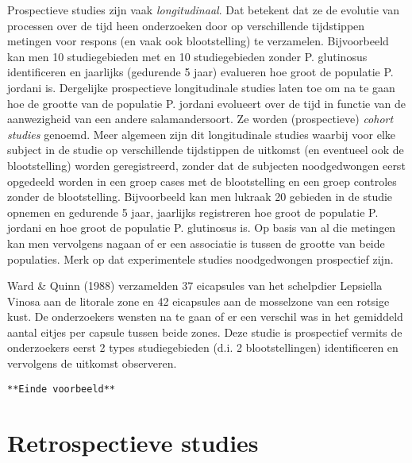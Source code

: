 \documentclass[12pt,dutch,coursenotes]{book}
\theoremstyle{definition}
\theoremstyle{definition}
\theoremstyle{definition}
\theoremstyle{remark}
\let\BeginKnitrBlock\begin \let\EndKnitrBlock\end
\begin{document}
Prospectieve studies zijn vaak \emph{longitudinaal}. Dat betekent dat ze
de evolutie van processen over de tijd heen onderzoeken door op
verschillende tijdstippen metingen voor respons (en vaak ook
blootstelling) te verzamelen. Bijvoorbeeld kan men 10 studiegebieden met
en 10 studiegebieden zonder P. glutinosus identificeren en jaarlijks
(gedurende 5 jaar) evalueren hoe groot de populatie P. jordani is.
Dergelijke prospectieve longitudinale studies laten toe om na te gaan
hoe de grootte van de populatie P. jordani evolueert over de tijd in
functie van de aanwezigheid van een andere salamandersoort. Ze worden
(prospectieve) \emph{cohort studies} genoemd. Meer algemeen zijn dit
longitudinale studies waarbij voor elke subject in de studie op
verschillende tijdstippen de uitkomst (en eventueel ook de
blootstelling) worden geregistreerd, zonder dat de subjecten
noodgedwongen eerst opgedeeld worden in een groep cases met de
blootstelling en een groep controles zonder de blootstelling.
Bijvoorbeeld kan men lukraak 20 gebieden in de studie opnemen en
gedurende 5 jaar, jaarlijks registreren hoe groot de populatie P.
jordani en hoe groot de populatie P. glutinosus is. Op basis van al die
metingen kan men vervolgens nagaan of er een associatie is tussen de
grootte van beide populaties. Merk op dat experimentele studies
noodgedwongen prospectief zijn.

\BeginKnitrBlock{example}[Vruchtbaarheid van schelpdieren]
\protect\hypertarget{exm:unnamed-chunk-31}{}{\label{exm:unnamed-chunk-31}
\iffalse (Vruchtbaarheid van schelpdieren) \fi{} }
\EndKnitrBlock{example}

Ward \& Quinn (1988) verzamelden 37 eicapsules van het schelpdier
Lepsiella Vinosa aan de litorale zone en 42 eicapsules aan de mosselzone
van een rotsige kust. De onderzoekers wensten na te gaan of er een
verschil was in het gemiddeld aantal eitjes per capsule tussen beide
zones. Deze studie is prospectief vermits de onderzoekers eerst 2 types
studiegebieden (d.i. 2 blootstellingen) identificeren en vervolgens de
uitkomst observeren.

\texttt{**Einde\ voorbeeld**}

\section{Retrospectieve studies}\label{subsec:design:retro}
\end{document}
